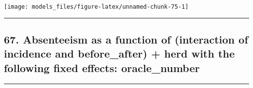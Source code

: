 \documentclass[]{article}
\begin{document}
\begin{center}\texttt{[image: models\_files/figure-latex/unnamed-chunk-75-1]} \end{center}

\newpage

\begin{center}\rule{0.5\linewidth}{\linethickness}\end{center}

\subsection{67. Absenteeism as a function of (interaction of incidence
and before\_after) + herd with the following fixed effects:
oracle\_number}\label{absenteeism-as-a-function-of-interaction-of-incidence-and-before_after-herd-with-the-following-fixed-effects-oracle_number-1}

\begin{center}\rule{0.5\linewidth}{\linethickness}\end{center}
\end{document}
